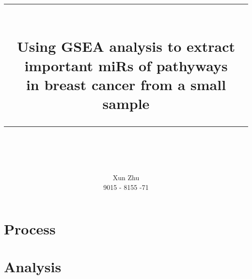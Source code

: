 \documentclass{scrartcl}
\title{
\normalfont
\rule{\linewidth}{0.5pt} \\[0.4cm]
\huge Using GSEA analysis to extract\\
important miRs of pathyways\\
in breast cancer from a small sample\\
\rule{\linewidth}{2pt} \\[0.5cm]
}
\author{Xun Zhu \\ \normalsize 9015 - 8155 -71}
\date{}
\begin{document}
\maketitle

\section{Process}

\subsection{}

\section{Analysis}
\end{document}
